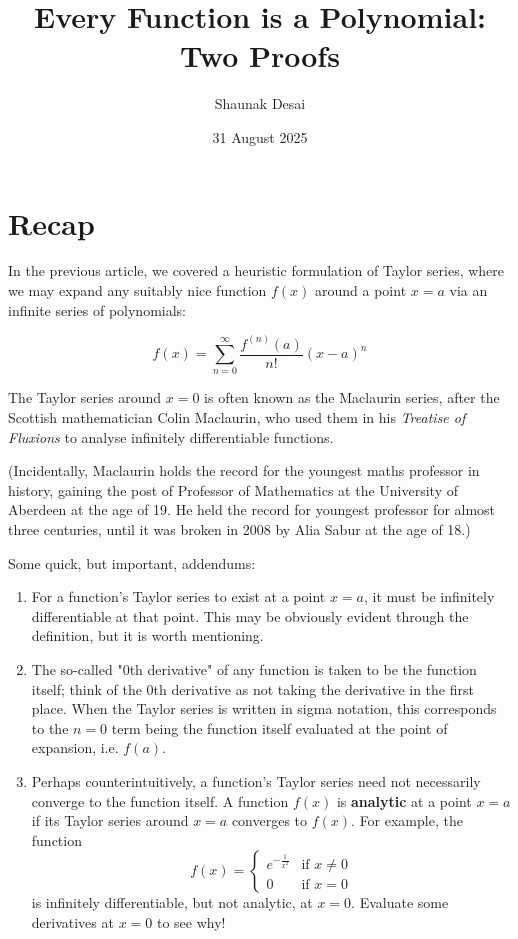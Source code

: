 \documentclass{article}
\title{Every Function is a Polynomial: Two Proofs}
\author{Shaunak Desai}
\date{31 August 2025}
\begin{document}
\maketitle
\section*{Recap}

In the previous article, we covered a heuristic formulation of Taylor series, where we may expand any suitably nice function $f(x)$ around a point $x=a$ via an infinite series of polynomials:

$$
f(x) = \sum_{n=0}^{\infty} \frac{f^{(n)}(a)}{n!} (x-a)^n
$$

The Taylor series around $x=0$ is often known as the Maclaurin series, after the Scottish mathematician Colin Maclaurin, who used them in his \textit{Treatise of Fluxions} to analyse infinitely differentiable functions.

(Incidentally, Maclaurin holds the record for the youngest maths professor in history, gaining the post of Professor of Mathematics at the University of Aberdeen at the age of 19. He held the record for youngest professor for almost three centuries, until it was broken in 2008 by Alia Sabur at the age of 18.)

Some quick, but important, addendums:
\begin{enumerate}
    \item For a function's Taylor series to exist at a point $x=a$, it must be infinitely differentiable at that point. This may be obviously evident through the definition, but it is worth mentioning.
    \item The so-called "0th derivative" of any function is taken to be the function itself; think of the 0th derivative as not taking the derivative in the first place. When the Taylor series is written in sigma notation, this corresponds to the $n=0$ term being the function itself evaluated at the point of expansion, i.e. $f(a)$.
    \item Perhaps counterintuitively, a function's Taylor series need not necessarily converge to the function itself. A function $f(x)$ is \textbf{analytic} at a point $x=a$ if its Taylor series around $x=a$ converges to $f(x)$. For example, the function
    $$
    f(x) =
    \begin{cases}
    e^{-\frac{1}{x^2}} & \text{if } x \neq 0 \\
    0 & \text{if } x = 0
    \end{cases}
    $$
    is infinitely differentiable, but not analytic, at $x=0$. Evaluate some derivatives at $x=0$ to see why!
\end{enumerate}
\end{document}
